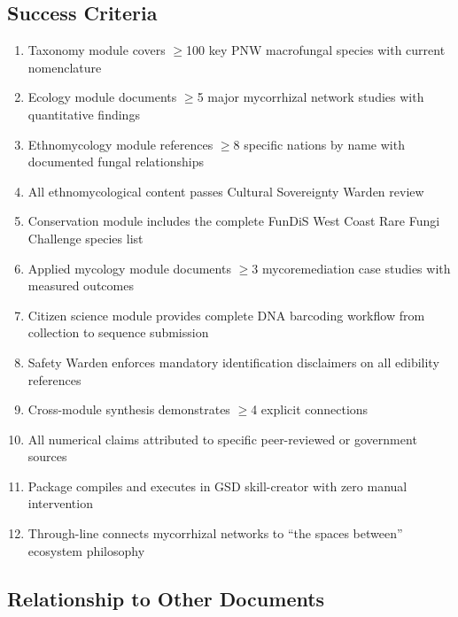 \documentclass[11pt,letterpaper]{article}
\begin{document}
\subsection{Success Criteria}

\begin{enumerate}[leftmargin=2em]
\item Taxonomy module covers $\geq$100 key PNW macrofungal species with current nomenclature
\item Ecology module documents $\geq$5 major mycorrhizal network studies with quantitative findings
\item Ethnomycology module references $\geq$8 specific nations by name with documented fungal relationships
\item All ethnomycological content passes Cultural Sovereignty Warden review
\item Conservation module includes the complete FunDiS West Coast Rare Fungi Challenge species list
\item Applied mycology module documents $\geq$3 mycoremediation case studies with measured outcomes
\item Citizen science module provides complete DNA barcoding workflow from collection to sequence submission
\item Safety Warden enforces mandatory identification disclaimers on all edibility references
\item Cross-module synthesis demonstrates $\geq$4 explicit connections
\item All numerical claims attributed to specific peer-reviewed or government sources
\item Package compiles and executes in GSD skill-creator with zero manual intervention
\item Through-line connects mycorrhizal networks to ``the spaces between'' ecosystem philosophy
\end{enumerate}

\subsection{Relationship to Other Documents}
\end{document}
